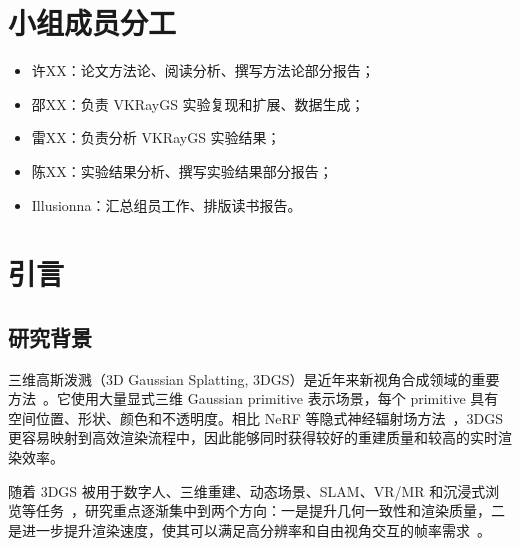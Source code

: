 \documentclass[12pt,hyperref,a4paper,UTF8]{ctexart}
\begin{document}
\cover

%
%

\thispagestyle{empty} %

\newpage
\thispagestyle{empty}
\tableofcontents
\thispagestyle{empty}


\newpage
\setcounter{page}{1}



\section{小组成员分工}

\begin{itemize}
    \item 许XX：论文方法论、阅读分析、撰写方法论部分报告；
    \item 邵XX：负责 VKRayGS 实验复现和扩展、数据生成；
    \item 雷XX：负责分析 VKRayGS 实验结果；
    \item 陈XX：实验结果分析、撰写实验结果部分报告；
    \item Illusionna：汇总组员工作、排版读书报告。
\end{itemize}



\section{引言}
\subsection{研究背景}
三维高斯泼溅（3D Gaussian Splatting, 3DGS）是近年来新视角合成领域的重要方法~\cite{3dgaussiansplatting}。它使用大量显式三维 Gaussian primitive 表示场景，每个 primitive 具有空间位置、形状、颜色和不透明度。相比 NeRF 等隐式神经辐射场方法~\cite{nerf,mipnerf360}，3DGS 更容易映射到高效渲染流程中，因此能够同时获得较好的重建质量和较高的实时渲染效率。

随着 3DGS 被用于数字人、三维重建、动态场景、SLAM、VR/MR 和沉浸式浏览等任务~\cite{hugs,dynamic3dgaussians,splatam}，研究重点逐渐集中到两个方向：一是提升几何一致性和渲染质量，二是进一步提升渲染速度，使其可以满足高分辨率和自由视角交互的帧率需求~\cite{flashgs,lightgaussian,compressed3dgs}。
\end{document}
